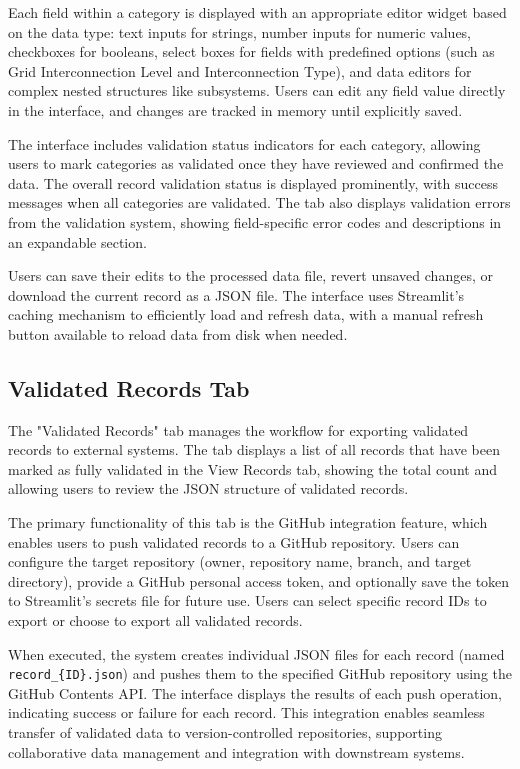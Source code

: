\documentclass[11pt]{article}
\begin{document}
Each field within a category is displayed with an appropriate editor widget based on the data type: text inputs for strings, number inputs for numeric values, checkboxes for booleans, select boxes for fields with predefined options (such as Grid Interconnection Level and Interconnection Type), and data editors for complex nested structures like subsystems. Users can edit any field value directly in the interface, and changes are tracked in memory until explicitly saved.

The interface includes validation status indicators for each category, allowing users to mark categories as validated once they have reviewed and confirmed the data. The overall record validation status is displayed prominently, with success messages when all categories are validated. The tab also displays validation errors from the validation system, showing field-specific error codes and descriptions in an expandable section.

Users can save their edits to the processed data file, revert unsaved changes, or download the current record as a JSON file. The interface uses Streamlit's caching mechanism to efficiently load and refresh data, with a manual refresh button available to reload data from disk when needed.

\subsection{Validated Records Tab}

The "Validated Records" tab manages the workflow for exporting validated records to external systems. The tab displays a list of all records that have been marked as fully validated in the View Records tab, showing the total count and allowing users to review the JSON structure of validated records.

The primary functionality of this tab is the GitHub integration feature, which enables users to push validated records to a GitHub repository. Users can configure the target repository (owner, repository name, branch, and target directory), provide a GitHub personal access token, and optionally save the token to Streamlit's secrets file for future use. Users can select specific record IDs to export or choose to export all validated records.

When executed, the system creates individual JSON files for each record (named \texttt{record\_\{ID\}.json}) and pushes them to the specified GitHub repository using the GitHub Contents API. The interface displays the results of each push operation, indicating success or failure for each record. This integration enables seamless transfer of validated data to version-controlled repositories, supporting collaborative data management and integration with downstream systems.
\end{document}
